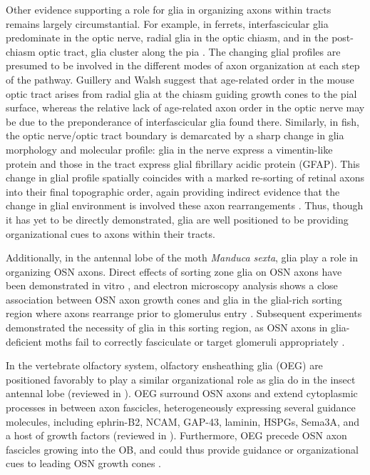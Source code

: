 Other evidence supporting a role for glia in organizing axons within tracts remains largely circumstantial. 
For example, in ferrets, interfascicular glia predominate in the optic nerve, radial glia in the optic chiasm, and in the post-chiasm optic tract, glia cluster along the pia \cite{guillery1987changing,colello1992observations}.
The changing glial profiles are presumed to be involved in the different modes of axon organization at each step of the pathway. 
Guillery and Walsh  suggest that age-related order in the mouse optic tract arises from radial glia at the chiasm guiding growth cones to the pial surface, whereas the relative lack of age-related axon order in the optic nerve may be due to the preponderance of interfascicular glia found there. 
Similarly, in fish, the optic nerve/optic tract boundary is demarcated by a sharp change in glia morphology and molecular profile: glia in the nerve express a vimentin-like protein and those in the tract express glial fibrillary acidic protein (GFAP).
This change in glial profile spatially coincides with a marked re-sorting of retinal axons into their final topographic order, again providing indirect evidence that the change in glial environment is involved these axon rearrangements \cite{maggs1986glial}.
Thus, though it has yet to be directly demonstrated, glia are well positioned to be providing organizational cues to axons within their tracts.

Additionally, in the antennal lobe of the moth \emph{Manduca sexta}, glia play a role in organizing OSN axons.
Direct effects of sorting zone glia on OSN axons have been demonstrated in vitro \cite{tucker2004vitro}, and electron microscopy analysis shows a close association between OSN axon growth cones and glia in the glial-rich sorting region where axons rearrange prior to glomerulus entry \cite{oland1998targeted}.
Subsequent experiments demonstrated the necessity of glia in this sorting region, as OSN axons in glia-deficient moths fail to correctly fasciculate or target glomeruli appropriately \cite{rossler1999development}. 

In the vertebrate olfactory system, olfactory ensheathing glia (OEG) are positioned favorably to play a similar organizational role as glia do in the insect antennal lobe (reviewed in ).
OEG surround OSN axons and extend cytoplasmic processes in between axon fascicles, heterogeneously expressing several guidance molecules, including ephrin-B2, NCAM, GAP-43, laminin, HSPGs, Sema3A, and a host of growth factors (reviewed in ).
Furthermore, OEG precede OSN axon fascicles growing into the OB, and could thus provide guidance or organizational cues to leading OSN growth cones \cite{chuah2002cellular,tolbert2004bidirectional}.

